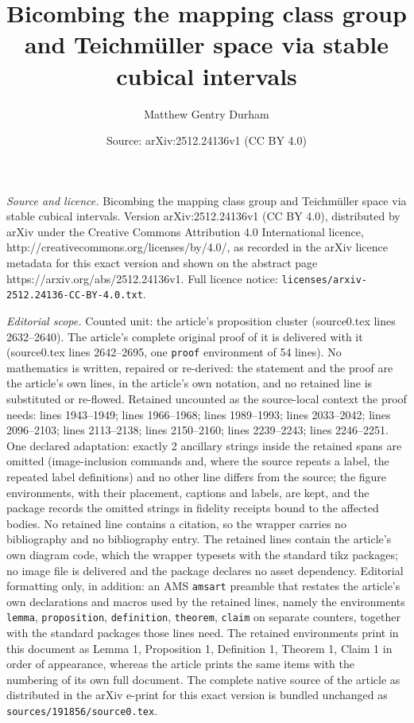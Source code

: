 \documentclass[10pt,a4paper]{amsart}
\title{Bicombing the mapping class group and Teichm\"uller space via stable cubical intervals}
\author{Matthew Gentry Durham}
\date{Source: arXiv:2512.24136v1 (CC BY 4.0)}
\begin{document}
\maketitle

\noindent\emph{Source and licence.} Bicombing the mapping class group and Teichm\"uller space via stable cubical intervals. Version arXiv:2512.24136v1 (CC BY 4.0), distributed by arXiv under the Creative Commons Attribution 4.0 International licence, http://creativecommons.org/licenses/by/4.0/, as recorded in the arXiv licence metadata for this exact version and shown on the abstract page https://arxiv.org/abs/2512.24136v1. Full licence notice: \texttt{licenses/arxiv-2512.24136-CC-BY-4.0.txt}.\par\smallskip

\noindent\textit{Editorial scope.} Counted unit: the article's proposition cluster (source0.tex lines 2632--2640). The article's complete original proof of it is delivered with it (source0.tex lines 2642--2695, one \texttt{proof} environment of 54 lines). No mathematics is written, repaired or re-derived: the statement and the proof are the article's own lines, in the article's own notation, and no retained line is substituted or re-flowed.  Retained uncounted as the source-local context the proof needs: lines 1943--1949; lines 1966--1968; lines 1989--1993; lines 2033--2042; lines 2096--2103; lines 2113--2138; lines 2150--2160; lines 2239--2243; lines 2246--2251.  One declared adaptation: exactly 2 ancillary strings inside the retained spans are omitted (image-inclusion commands and, where the source repeats a label, the repeated label definitions) and no other line differs from the source; the figure environments, with their placement, captions and labels, are kept, and the package records the omitted strings in fidelity receipts bound to the affected bodies.  No retained line contains a citation, so the wrapper carries no bibliography and no bibliography entry.  The retained lines contain the article's own diagram code, which the wrapper typesets with the standard tikz packages; no image file is delivered and the package declares no asset dependency.  Editorial formatting only, in addition: an AMS \texttt{amsart} preamble that restates the article's own declarations and macros used by the retained lines, namely the environments \texttt{lemma}, \texttt{proposition}, \texttt{definition}, \texttt{theorem}, \texttt{claim} on separate counters, together with the standard packages those lines need.  The retained environments print in this document as Lemma 1, Proposition 1, Definition 1, Theorem 1, Claim 1 in order of appearance, whereas the article prints the same items with the numbering of its own full document.  The complete native source of the article as distributed in the arXiv e-print for this exact version is bundled unchanged as \texttt{sources/191856/source0.tex}.
\end{document}
